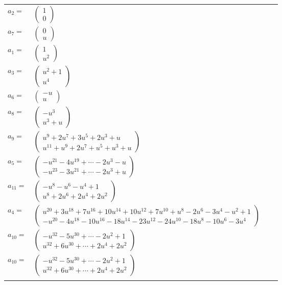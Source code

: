 \documentclass[1p]{elsarticle_modified}
\theoremstyle{definition}
\begin{document}
\begin{tabular}{m{7pt} m{180pt} m{7pt} m{180pt} }
\flushright $a_{2}=$&$\begin{pmatrix}1\\0\end{pmatrix}$ \\
\flushright $a_{7}=$&$\begin{pmatrix}0\\u\end{pmatrix}$ \\
\flushright $a_{1}=$&$\begin{pmatrix}1\\u^2\end{pmatrix}$ \\
\flushright $a_{3}=$&$\begin{pmatrix}u^2+1\\u^4\end{pmatrix}$ \\
\flushright $a_{6}=$&$\begin{pmatrix}- u\\u\end{pmatrix}$ \\
\flushright $a_{8}=$&$\begin{pmatrix}- u^3\\u^3+u\end{pmatrix}$ \\
\flushright $a_{9}=$&$\begin{pmatrix}u^9+2 u^7+3 u^5+2 u^3+u\\u^{11}+u^9+2 u^7+u^5+u^3+u\end{pmatrix}$ \\
\flushright $a_{5}=$&$\begin{pmatrix}- u^{21}-4 u^{19}+\cdots-2 u^3- u\\- u^{23}-3 u^{21}+\cdots-2 u^3+u\end{pmatrix}$ \\
\flushright $a_{11}=$&$\begin{pmatrix}- u^8- u^6- u^4+1\\u^8+2 u^6+2 u^4+2 u^2\end{pmatrix}$ \\
\flushright $a_{4}=$&$\begin{pmatrix}u^{20}+3 u^{18}+7 u^{16}+10 u^{14}+10 u^{12}+7 u^{10}+u^8-2 u^6-3 u^4- u^2+1\\- u^{20}-4 u^{18}-10 u^{16}-18 u^{14}-23 u^{12}-24 u^{10}-18 u^8-10 u^6-3 u^4\end{pmatrix}$ \\
\flushright $a_{10}=$&$\begin{pmatrix}- u^{32}-5 u^{30}+\cdots-2 u^2+1\\u^{32}+6 u^{30}+\cdots+2 u^4+2 u^2\end{pmatrix}$\\ \flushright $a_{10}=$&$\begin{pmatrix}- u^{32}-5 u^{30}+\cdots-2 u^2+1\\u^{32}+6 u^{30}+\cdots+2 u^4+2 u^2\end{pmatrix}$\\&\end{tabular}
\end{document}
